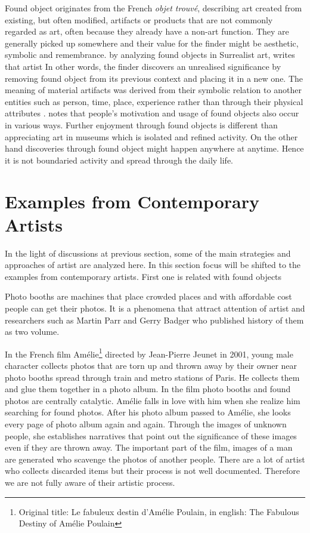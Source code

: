 Found object originates from the French \textit{objet trouvé}, describing art created from existing, but often modified, artifacts or products that are not commonly regarded as art, often because they already have a non-art function. They are generally picked up somewhere and their value for the finder might be aesthetic, symbolic and remembrance. \citet[170]{gascoyne1936short} by analyzing found objects in Surrealist art, writes that artist  In other words, the finder discovers an unrealised significance by removing found object from its previous context and placing it in a new one. The meaning of material artifacts was derived from their symbolic relation to another entities such as person, time, place, experience rather than through their physical attributes \citep{camic2010trashed}. \cite{camic2010trashed} notes that people’s motivation and usage of found objects also occur in various ways. Further enjoyment through found objects is different than appreciating art in museums which is isolated and refined activity. On the other hand discoveries through found object might happen anywhere at anytime. Hence it is not boundaried activity and spread through the daily life.



\section{Examples from Contemporary Artists}
In the light of discussions at previous section, some of the main strategies and approaches of artist are analyzed here. In this section focus will be shifted to the examples from contemporary artists. First one is related with found objects

Photo booths are machines that place crowded places and with affordable cost people can get their photos. It is a phenomena that attract attention of artist and researchers such as Martin Parr and Gerry Badger who published history of them as two volume.

In the French film Amélie\footnote{Original title: Le fabuleux destin d’Amélie Poulain, in english: The Fabulous Destiny of Amélie Poulain} directed by Jean-Pierre Jeunet in 2001, young male character collects photos that are torn up and thrown away by their owner near photo booths spread through train and metro stations of Paris. He collects them and glue them together in a photo album. In the film photo booths and found photos are centrally catalytic. Amélie falls in love with him when she realize him searching for found photos. After his photo album passed to Amélie, she looks every page of photo album again and again. Through the images of unknown people, she establishes narratives that point out the significance of these images even if they are thrown away. The important part of the film, images of a man are generated who scavenge the photos of another people. There are a lot of artist who collects discarded items but their process is not well documented. Therefore we are not fully aware of their artistic process. 

